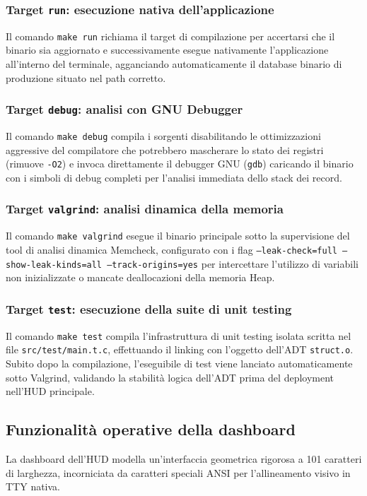 \documentclass[12pt, a4paper]{article}
\begin{document}
\subsubsection{Target \texttt{run}: esecuzione nativa dell'applicazione}
Il comando \texttt{make run} richiama il target di compilazione per accertarsi che il binario sia aggiornato e successivamente esegue nativamente l'applicazione all'interno del terminale, agganciando automaticamente il database binario di produzione situato nel path corretto.

\subsubsection{Target \texttt{debug}: analisi con GNU Debugger}
Il comando \texttt{make debug} compila i sorgenti disabilitando le ottimizzazioni aggressive del compilatore che potrebbero mascherare lo stato dei registri (rimuove \texttt{-O2}) e invoca direttamente il debugger GNU (\texttt{gdb}) caricando il binario con i simboli di debug completi per l'analisi immediata dello stack dei record.

\subsubsection{Target \texttt{valgrind}: analisi dinamica della memoria}
Il comando \texttt{make valgrind} esegue il binario principale sotto la supervisione del tool di analisi dinamica Memcheck, configurato con i flag \texttt{--leak-check=full --show-leak-kinds=all --track-origins=yes} per intercettare l'utilizzo di variabili non inizializzate o mancate deallocazioni della memoria Heap.

\subsubsection{Target \texttt{test}: esecuzione della suite di unit testing}
Il comando \texttt{make test} compila l'infrastruttura di unit testing isolata scritta nel file \texttt{src/test/main.t.c}, effettuando il linking con l'oggetto dell'ADT \texttt{struct.o}. Subito dopo la compilazione, l'eseguibile di test viene lanciato automaticamente sotto Valgrind, validando la stabilità logica dell'ADT prima del deployment nell'HUD principale.

\subsection{Funzionalità operative della dashboard}
La dashboard dell'HUD modella un'interfaccia geometrica rigorosa a 101 caratteri di larghezza, incorniciata da caratteri speciali ANSI per l'allineamento visivo in TTY nativa.
\end{document}
